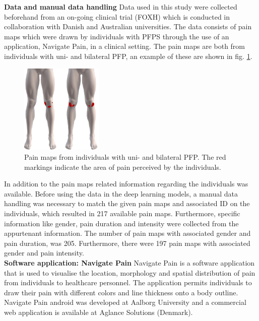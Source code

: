 \textbf{Data and manual data handling} \newline
Data used in this study were collected beforehand from an on-going clinical trial (FOXH) which is conducted in collaboration with Danish and Australian universities. The data consists of pain maps which were drawn by individuals with PFPS through the use of an application, Navigate Pain, in a clinical setting. The pain maps are both from individuals with uni- and bilateral PFP, an example of these are shown in fig. \ref{fig:twoPainmaps}.

\begin{figure}[H]
\centering
\includegraphics[width=0.35\textwidth]{Figures/twoPainmaps}
\caption{Pain maps from individuals with uni- and bilateral PFP. The red markings indicate the area of pain perceived by the individuals.}
\label{fig:twoPainmaps}
\end{figure}

\noindent
In addition to the pain maps related information regarding the individuals was available.
Before using the data in the deep learning models, a manual data handling was necessary to match the given pain maps and associated ID on the individuals, which resulted in 217 available pain maps. Furthermore, specific information like gender, pain duration and intensity were collected from the appurtenant information. The number of pain maps with associated gender and pain duration, was 205. Furthermore, there were 197 pain maps with associated gender and pain intensity.\\

\noindent
\textbf{Software application: Navigate Pain} \newline
Navigate Pain is a software application that is used to visualise the location, morphology and spatial distribution of pain from individuals to healthcare personnel. The application permits individuals to draw their pain with different colors and line thickness onto a body outline. Navigate Pain android was developed at Aalborg University and a commercial web application is available at Aglance Solutions (Denmark).\citep{Solutions2015}\\

